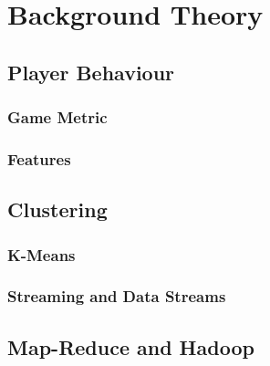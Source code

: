 
\chapter{Background Theory} %
\label{Chapter2}


\section{Player Behaviour}
\subsection{Game Metric}
\subsection{Features}
\section{Clustering}
\subsection{K-Means}
\subsection{Streaming and Data Streams}
\section{Map-Reduce and Hadoop}
